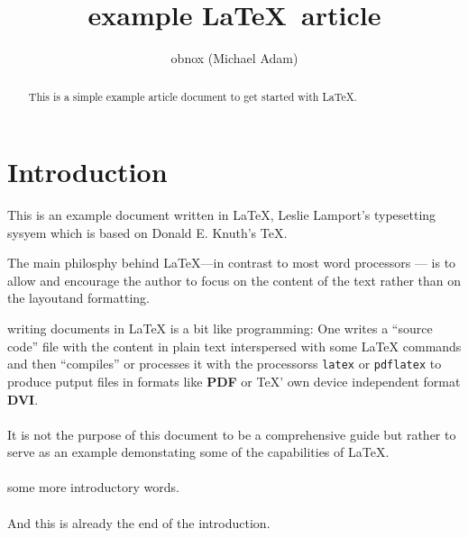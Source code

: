 \documentclass{article}
\title{example \LaTeX\ article}
\author{obnox (Michael Adam)}
\begin{document}
\maketitle

\begin{abstract}

    This is a simple  example article document to get started with  {\LaTeX}.

\end{abstract}

\tableofcontents

\section*{Introduction}

This is an example document written in {\LaTeX}, Leslie Lamport's typesetting
sysyem which is based on Donald E. Knuth's {\TeX}.

The main philosphy behind {\LaTeX}---in contrast to most word processors --- is to allow and encourage the author to
focus on the content of the text rather than on the layoutand formatting.

writing documents in {\LaTeX} is a bit like programming: One writes a ``source code''  file with the content in plain text
interspersed with some {\LaTeX} commands
and then ``compiles'' or processes it with the processorss \verb|latex| or \verb|pdflatex| to produce
putput files in formats like \textbf{PDF} or {\TeX}' own device independent format \textbf{DVI}.

\paragraph{} It is not the purpose of this document to be a comprehensive guide but rather to serve as an example demonstating some of the capabilities of  {\LaTeX}.


\paragraph{} some more introductory words.

\paragraph{} And this is already the end of the introduction.
\end{document}
